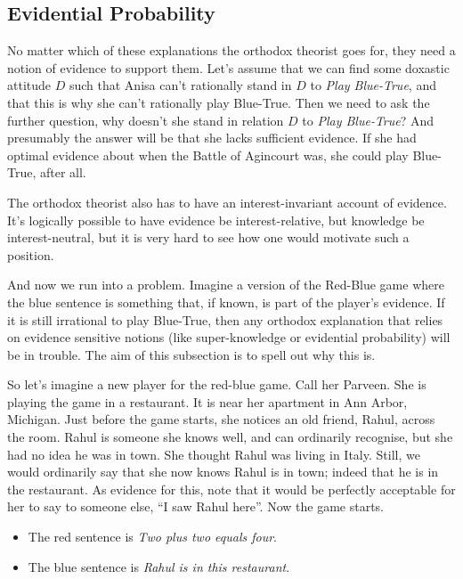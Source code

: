 \documentclass[11pt,]{book}
\providecommand{\tightlist}{%
  \setlength{\itemsep}{0pt}\setlength{\parskip}{0pt}}
\begin{document}
\hypertarget{orthodoxevidence}{%
\subsection{Evidential Probability}\label{orthodoxevidence}}

No matter which of these explanations the orthodox theorist goes for, they need a notion of evidence to support them. Let's assume that we can find some doxastic attitude \(D\) such that Anisa can't rationally stand in \(D\) to \emph{Play Blue-True}, and that this is why she can't rationally play Blue-True. Then we need to ask the further question, why doesn't she stand in relation \(D\) to \emph{Play Blue-True}? And presumably the answer will be that she lacks sufficient evidence. If she had optimal evidence about when the Battle of Agincourt was, she could play Blue-True, after all.

The orthodox theorist also has to have an interest-invariant account of evidence. It's logically possible to have evidence be interest-relative, but knowledge be interest-neutral, but it is very hard to see how one would motivate such a position.

And now we run into a problem. Imagine a version of the Red-Blue game where the blue sentence is something that, if known, is part of the player's evidence. If it is still irrational to play Blue-True, then any orthodox explanation that relies on evidence sensitive notions (like super-knowledge or evidential probability) will be in trouble. The aim of this subsection is to spell out why this is.

So let's imagine a new player for the red-blue game. Call her Parveen. She is playing the game in a restaurant. It is near her apartment in Ann Arbor, Michigan. Just before the game starts, she notices an old friend, Rahul, across the room. Rahul is someone she knows well, and can ordinarily recognise, but she had no idea he was in town. She thought Rahul was living in Italy. Still, we would ordinarily say that she now knows Rahul is in town; indeed that he is in the restaurant. As evidence for this, note that it would be perfectly acceptable for her to say to someone else, ``I saw Rahul here''. Now the game starts.

\begin{itemize}
\tightlist
\item
  The red sentence is \emph{Two plus two equals four}.
\item
  The blue sentence is \emph{Rahul is in this restaurant}.
\end{itemize}
\end{document}

